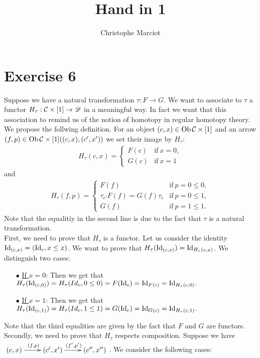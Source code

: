 \documentclass[11pt, a4paper, twoside]{article}
\begin{document}
\title{Hand in 1}
\author{Christophe Marciot}
\maketitle

\section*{Exercise 6}
Suppose we have a natural transformation $\tau:F\rightarrow G$. We want to associate to $\tau$ a functor $H_\tau:\mathcal{C}\times[1]\rightarrow\mathscr D$ in a meaningful way. In fact we want that this association to remind us of the notion of homotopy in regular homotopy theory. \\
We propose the follwing definition. For an object $(c,x)\in \operatorname{Ob}\mathcal{C}\times[1]$ and an arrow $(f,p)\in \operatorname{Ob}\mathcal{C}\times[1]((c,x),(c',x'))$ we set their image by $H_\tau$:
	\begin{align*}
		H_\tau(c,x)=
			\begin{cases}
				F(c) &  \mathrm{if}\ x=0,\\
				G(c) & \mathrm{if}\ x=1
			\end{cases}
	\end{align*}
and 
	\begin{align*}
		H_\tau(f,p)=
			\begin{cases}
				F(f)  & \mathrm{if}\ p=0\leq0,\\
				\tau_{c'}F(f)=G(f)\tau_c & \mathrm{if}\ p=0\leq1,\\
				G(f) & \mathrm{if}\ p=1\leq1.
			\end{cases}
	\end{align*}
Note that the equalitiy in the second line is due to the fact that $\tau$ is a natural transformation.\\
 First, we need to prove that $H_\tau$ is a functor. Let us consider the identity $\mathrm{Id}_{(c,x)}=(\mathrm{Id}_c,x\leq x)$. We want to prove that $H_\tau(\mathrm{Id}_{(c,x)})=\mathrm{Id}_{H_\tau(c,x)}$. We distinguish two cases:
 	\begin{itemize}
		\item[$\bullet$] \underline{If $x=0$}: Then we get that $H_\tau(\mathrm{Id}_{(c,0)})=H_\tau(Id_c,0\leq0)=F(\mathrm{Id}_c)=\mathrm{Id}_{F(c)}=\mathrm{Id}_{H_\tau(c,0)}.$
		\item[$\bullet$] \underline{If $x=1$}: Then we get that $H_\tau(\mathrm{Id}_{(c,1)})=H_\tau(Id_c,1\leq1)=G(\mathrm{Id}_c)=\mathrm{Id}_{G(c)}=\mathrm{Id}_{H_\tau(c,1)}.$
	\end{itemize}
 Note that the third equalities are given by the fact that $F$ and $G$ are functors. Secondly, we need to prove that $H_\tau$ respects composition. Suppose we have $\xymatrix{(c,x)\ar[r]^{(f,p)}& (c',x')\ar[r]^{(f',p')}& (c'',x'')}$. We consider the following cases:
\end{document}
